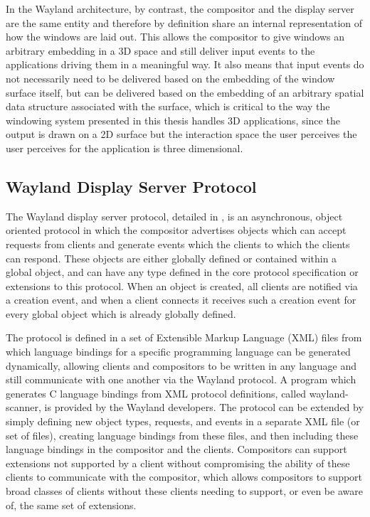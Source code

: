 In the Wayland architecture, by contrast, the compositor and the display server are the same entity and therefore by definition share an internal representation of how the windows are laid out. This allows the compositor to give windows an arbitrary embedding in a 3D space and still deliver input events to the applications driving them in a meaningful way. It also means that input events do not necessarily need to be delivered based on the embedding of the window surface itself, but can be delivered based on the embedding of an arbitrary spatial data structure associated with the surface, which is critical to the way the windowing system presented in this thesis handles 3D applications, since the output is drawn on a 2D surface but the interaction space the user perceives the user perceives for the application is three dimensional.


\subsection{Wayland Display Server Protocol}
\label{sec:wayland-protocol}

The Wayland display server protocol, detailed in \cite{wayland-protocol}, is an asynchronous, object oriented protocol in which the compositor advertises objects which can accept requests from clients and generate events which the clients to which the clients can respond. These objects are either globally defined or contained within a global object, and can have any type defined in the core protocol specification or extensions to this protocol. When an object is created, all clients are notified via a creation event, and when a client connects it receives such a creation event for every global object which is already globally defined.

The protocol is defined in a set of Extensible Markup Language (XML) files from which language bindings for a specific programming language can be generated dynamically, allowing clients and compositors to be written in any language and still communicate with one another via the Wayland protocol. A program which generates C language bindings from XML protocol definitions, called wayland-scanner, is provided by the Wayland developers. The protocol can be extended by simply defining new object types, requests, and events in a separate XML file (or set of files), creating language bindings from these files, and then including these language bindings in the compositor and the clients. Compositors can support extensions not supported by a client without compromising the ability of these clients to communicate with the compositor, which allows compositors to support broad classes of clients without these clients needing to support, or even be aware of, the same set of extensions.

